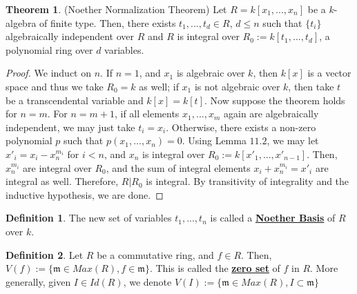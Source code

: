 \documentclass{article}
\theoremstyle{definition}
\newtheorem{theorem}{Theorem}[section]
\theoremstyle{definition}
\theoremstyle{definition}
\theoremstyle{definition}
\theoremstyle{definition}
\newtheorem{definition}{Definition}[section]
\theoremstyle{definition}
\theoremstyle{definition}
\begin{document}
\begin{tcolorbox}[colback=red!5!white,colframe=red!30!white]
\begin{theorem}
(Noether Normalization Theorem) Let $R=k[x_1,...,x_n]$ be a $k$-algebra of finite type. Then, there exists $t_1,...,t_d\in R$, $d\leq n$ such that $\{t_i\}$ algebraically independent over $R$ and $R$ is integral over $R_0:=k[t_1,...,t_d]$, a polynomial ring over $d$ variables.  
\end{theorem}
\end{tcolorbox}
\begin{proof}
We induct on $n$. If $n=1$, and $x_1$ is algebraic over $k$, then $k[x]$ is a vector space and thus we take $R_0=k$ as well; if $x_1$ is not algebraic over $k$, then take $t$ be a transcendental variable and $k[x]=k[t]$. Now suppose the theorem holds for $n=m$. For $n=m+1$, if all elements $x_1,...,x_m$ again are algebraically independent, we may just take $t_i=x_i$. Otherwise, there exists a non-zero polynomial $p$ such that $p(x_1,...,x_n)=0$. Using Lemma $11.2$, we may let $x'_i=x_i-x_n^{m_i}$ for $i<n$, and $x_n$ is integral over $R_0:=k[x'_1,...,x'_{n-1}]$. Then, $x_n^{m_i}$ are integral over $R_0$, and the sum of integral elements $x_i+x_n^{m_i}=x'_i$ are integral as well. Therefore, $R|R_0$ is integral. By transitivity of integrality and the inductive hypothesis, we are done. 
\end{proof}



\begin{tcolorbox}[colback=purple!5!white,colframe=purple!75!black]
\begin{definition}
The new set of variables $t_1,...,t_n$ is called a \underline{\textbf{Noether Basis}} of $R$ over $k$. 
\end{definition}
\end{tcolorbox}



\begin{tcolorbox}[colback=purple!5!white,colframe=purple!75!black]
\begin{definition}
Let $R$ be a commutative ring, and $f\in R$. Then, $V(f):=\{\mathfrak{m}\in Max(R), f\in \mathfrak{m}\}$. This is called the \underline{\textbf{zero set}} of $f$ in $R$. More generally, given $I\in Id(R)$, we denote $V(I):=\{\mathfrak{m}\in Max(R), I\subset \mathfrak{m}\}$
\end{definition}
\end{tcolorbox}
\end{document}
